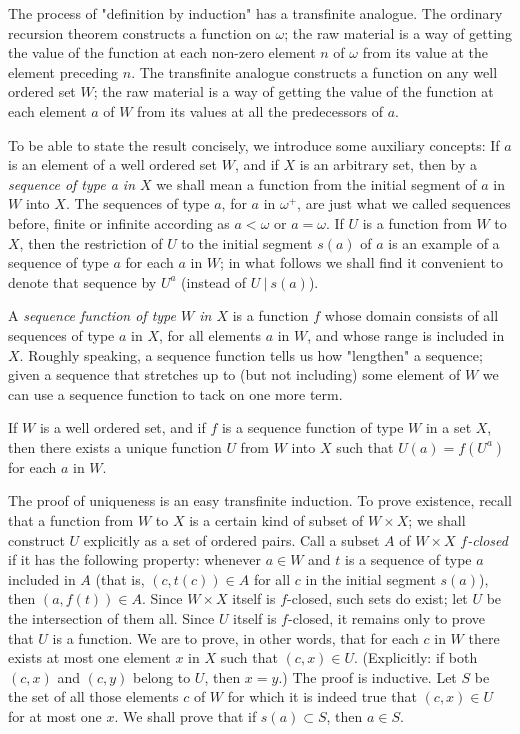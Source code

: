 
The process of "definition by induction" has a   transfinite analogue. The ordinary recursion theorem constructs a function on $\omega$; the raw material is a way of getting the value of the function at each non-zero element $n$ of $\omega$ from its value at the element preceding $n$. The transfinite analogue constructs a function on any well ordered set $W$; the raw material is a way of getting the value of the function at each element $a$ of $W$ from its values at all the predecessors of $a$. 

To be able to state the result concisely, we introduce some auxiliary concepts: If $a$ is an element of a well ordered set $W$, and if $X$ is an arbitrary set, then by a \textit{sequence of type a in $X$} we shall mean a function from the initial segment of $a$ in $W$ into $X$. The sequences of type $a$, for $a$ in $\omega^{+}$, are just what we called sequences before, finite or infinite according as $a < \omega$ or $a =  \omega$. If $U$ is a function from $W$ to $X$, then the restriction of $U$ to the initial segment $s(a)$ of $a$ is an example of a sequence of type $a$ for each $a$ in $W$; in what follows we shall find it convenient to denote that sequence by $U^{a}$ (instead of $U\ |\ s(a)$).

A \textit{sequence function of type $W$ in $X$} is a function $f$ whose domain consists of all sequences of type $a$ in $X$, for all elements $a$ in $W$, and whose range is included in $X$. Roughly speaking, a sequence function tells us how "lengthen" a sequence; given a sequence that stretches up to (but not including) some element of $W$ we can use a sequence function to tack on one more term. 

\begin{named} If $W$ is a well ordered set, and if $f$ is a sequence function of type $W$ in a set $X$, then there exists a unique function $U$ from $W$ into $X$ such that $U(a) = f(U^{a})$ for each $a$ in $W$.
\end{named}

\subtitle{Proof} The proof of uniqueness is an easy transfinite induction. To prove existence, recall that a function from $W$ to $X$ is a certain kind of subset of $W \times X$; we shall construct $U$ explicitly as a set of ordered pairs. Call a subset $A$ of $W \times X$ $f$\textit{-closed} if it has the following property: whenever $a \in W$ and $t$ is a sequence of type $a$ included in $A$ (that is, $(c, t(c)) \in A$ for all $c$ in the initial segment $s(a)$), then $(a,f(t)) \in A$. Since $W \times X$ itself is $f$-closed, such sets do exist; let $U$ be the intersection of them all. Since $U$ itself is $f$-closed, it remains only to prove that $U$ is a function. We are to prove, in other words, that for each $c$ in $W$ there exists at most one element $x$ in $X$ such that $(c,x) \in U$. (Explicitly: if both $(c, x)$ and $(c,y)$ belong to $U$, then $x = y$.) The proof is inductive. Let $S$ be the set of all those elements $c$ of $W$ for which it is indeed true that $(c, x) \in U$ for at most one $x$. We shall prove that if $s(a) \subset S$, then $a \in S$. 

